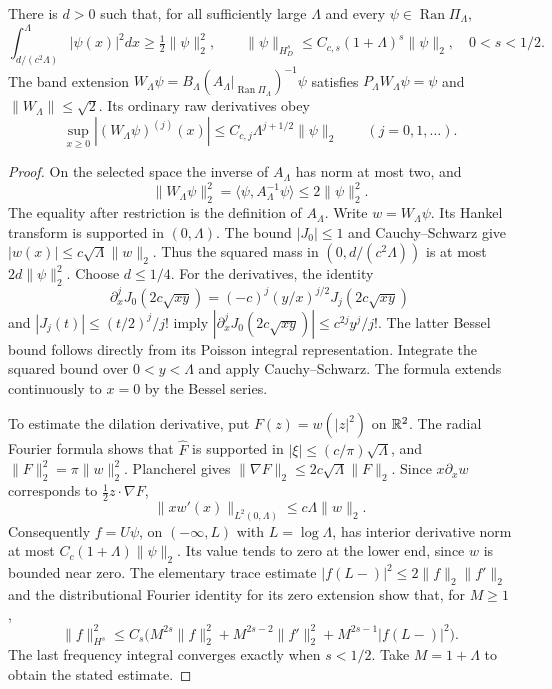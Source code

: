 \begin{proposition}
\label{prop:hankel-raw-estimates}
There is $d>0$ such that, for all sufficiently large $\Lambda$ and
every $\psi\in\operatorname{Ran}\Pi_\Lambda$,
\[
 \int_{d/(c^2\Lambda)}^\Lambda|\psi(x)|^2dx
       \geq\tfrac12\|\psi\|_2^2,
 \qquad
 \|\psi\|_{H_D^s}\leq C_{c,s}(1+\Lambda)^s\|\psi\|_2,
                   \quad0<s<1/2.
\]
The band extension
$W_\Lambda\psi=B_\Lambda(A_\Lambda|_{\operatorname{Ran}\Pi_\Lambda})^{-1}\psi$
satisfies $P_\Lambda W_\Lambda\psi=\psi$ and
$\|W_\Lambda\|\leq\sqrt2$.
Its ordinary raw derivatives obey
\[
 \sup_{x\geq0}|(W_\Lambda\psi)^{(j)}(x)|
             \leq C_{c,j}\Lambda^{j+1/2}\|\psi\|_2
                 \qquad(j=0,1,\ldots).
\]
\end{proposition}
\begin{proof}
On the selected space the inverse of $A_\Lambda$ has norm at most
two, and
\[
 \|W_\Lambda\psi\|_2^2
     =\langle\psi,A_\Lambda^{-1}\psi\rangle\leq2\|\psi\|_2^2.
\]
The equality after restriction is the definition of $A_\Lambda$.
Write $w=W_\Lambda\psi$. Its Hankel transform is supported in
$(0,\Lambda)$. The bound $|J_0|\leq1$ and Cauchy--Schwarz give
$|w(x)|\leq c\sqrt\Lambda\|w\|_2$.
Thus the squared mass in $(0,d/(c^2\Lambda))$ is at most
$2d\|\psi\|_2^2$. Choose $d\leq1/4$.
For the derivatives, the identity
\[
 \partial_x^jJ_0(2c\sqrt{xy})
       =(-c)^j(y/x)^{j/2}J_j(2c\sqrt{xy})
\]
and $|J_j(t)|\leq(t/2)^j/j!$ imply
$|\partial_x^jJ_0(2c\sqrt{xy})|\leq c^{2j}y^j/j!$.
The latter Bessel bound follows directly from its Poisson integral
representation. Integrate the squared bound over $0<y<\Lambda$
and apply Cauchy--Schwarz. The formula extends continuously to
$x=0$ by the Bessel series.

To estimate the dilation derivative, put $F(z)=w(|z|^2)$ on
$\mathbb R^2$. The radial Fourier formula shows that $\widehat F$ is
supported in $|\xi|\leq(c/\pi)\sqrt\Lambda$, and
$\|F\|_2^2=\pi\|w\|_2^2$. Plancherel gives
$\|\nabla F\|_2\leq2c\sqrt\Lambda\|F\|_2$.
Since $x\partial_xw$ corresponds to $\tfrac12z\cdot\nabla F$,
\[
 \|xw'(x)\|_{L^2(0,\Lambda)}
             \leq c\Lambda\|w\|_2.
\]
Consequently $f=U\psi$, on $(-\infty,L)$ with $L=\log\Lambda$,
has interior derivative norm at most
$C_c(1+\Lambda)\|\psi\|_2$. Its value tends to zero at the lower
end, since $w$ is bounded near zero. The elementary trace estimate
$|f(L-)|^2\leq2\|f\|_2\|f'\|_2$ and the distributional Fourier
identity for its zero extension show that, for $M\geq1$,
\[
 \|f\|_{H^s}^2\leq C_s\bigl(
 M^{2s}\|f\|_2^2+M^{2s-2}\|f'\|_2^2
                         +M^{2s-1}|f(L-)|^2\bigr).
\]
The last frequency integral converges exactly when $s<1/2$.
Take $M=1+\Lambda$ to obtain the stated estimate.
\end{proof}

